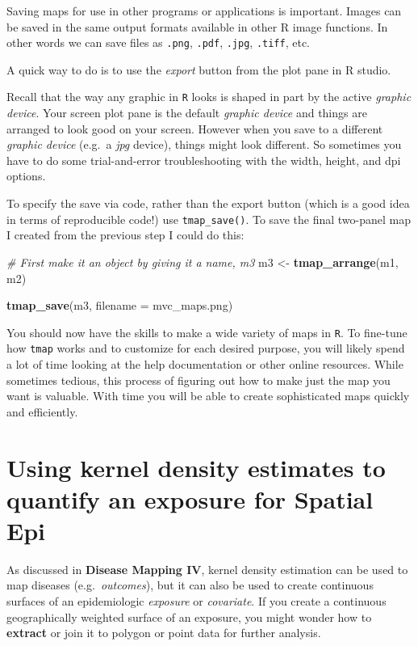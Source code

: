 \documentclass[
]{book}
\newenvironment{Shaded}{\begin{snugshade}}{\end{snugshade}}
\newcommand{\AttributeTok}[1]{\textcolor[rgb]{0.13,0.29,0.53}{#1}}
\newcommand{\CommentTok}[1]{\textcolor[rgb]{0.56,0.35,0.01}{\textit{#1}}}
\newcommand{\FunctionTok}[1]{\textcolor[rgb]{0.13,0.29,0.53}{\textbf{#1}}}
\newcommand{\NormalTok}[1]{#1}
\newcommand{\OtherTok}[1]{\textcolor[rgb]{0.56,0.35,0.01}{#1}}
\newcommand{\StringTok}[1]{\textcolor[rgb]{0.31,0.60,0.02}{#1}}
\begin{document}
Saving maps for use in other programs or applications is important. Images can be saved in the same output formats available in other R image functions. In other words we can save files as \texttt{.png}, \texttt{.pdf}, \texttt{.jpg}, \texttt{.tiff}, etc.

A quick way to do is to use the \emph{export} button from the plot pane in R studio.

Recall that the way any graphic in \texttt{R} looks is shaped in part by the active \emph{graphic device}. Your screen plot pane is the default \emph{graphic device} and things are arranged to look good on your screen. However when you save to a different \emph{graphic device} (e.g.~a \emph{jpg} device), things might look different. So sometimes you have to do some trial-and-error troubleshooting with the width, height, and dpi options.

To specify the save via code, rather than the export button (which is a good idea in terms of reproducible code!) use \texttt{tmap\_save()}. To save the final two-panel map I created from the previous step I could do this:

\begin{Shaded}
\begin{Highlighting}[]
\CommentTok{\# First make it an object by giving it a name, m3}
\NormalTok{m3 }\OtherTok{\textless{}{-}} \FunctionTok{tmap\_arrange}\NormalTok{(m1, m2)}

\FunctionTok{tmap\_save}\NormalTok{(m3, }\AttributeTok{filename =} \StringTok{\textquotesingle{}mvc\_maps.png\textquotesingle{}}\NormalTok{)}
\end{Highlighting}
\end{Shaded}

You should now have the skills to make a wide variety of maps in \texttt{R}. To fine-tune how \texttt{tmap} works and to customize for each desired purpose, you will likely spend a lot of time looking at the help documentation or other online resources. While sometimes tedious, this process of figuring out how to make just the map you want is valuable. With time you will be able to create sophisticated maps quickly and efficiently.

\hypertarget{kde-extract}{%
\chapter{Using kernel density estimates to quantify an exposure for Spatial Epi}\label{kde-extract}}

As discussed in \textbf{Disease Mapping IV}, kernel density estimation can be used to map diseases (e.g.~\emph{outcomes}), but it can also be used to create continuous surfaces of an epidemiologic \emph{exposure} or \emph{covariate}. If you create a continuous geographically weighted surface of an exposure, you might wonder how to \textbf{extract} or join it to polygon or point data for further analysis.
\end{document}

